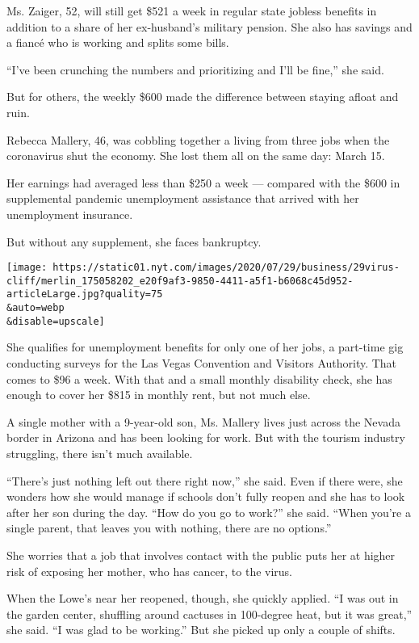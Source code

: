 Ms. Zaiger, 52, will still get \$521 a week in regular state jobless
benefits in addition to a share of her ex-husband's military pension.
She also has savings and a fiancé who is working and splits some bills.

``I've been crunching the numbers and prioritizing and I'll be fine,''
she said.

But for others, the weekly \$600 made the difference between staying
afloat and ruin.

Rebecca Mallery, 46, was cobbling together a living from three jobs when
the coronavirus shut the economy. She lost them all on the same day:
March 15.

Her earnings had averaged less than \$250 a week --- compared with the
\$600 in supplemental pandemic unemployment assistance that arrived with
her unemployment insurance.

But without any supplement, she faces bankruptcy.

\texttt{[image: https://static01.nyt.com/images/2020/07/29/business/29virus-cliff/merlin\_175058202\_e20f9af3-9850-4411-a5f1-b6068c45d952-articleLarge.jpg?quality=75\\\&auto=webp\\\&disable=upscale]}

She qualifies for unemployment benefits for only one of her jobs, a
part-time gig conducting surveys for the Las Vegas Convention and
Visitors Authority. That comes to \$96 a week. With that and a small
monthly disability check, she has enough to cover her \$815 in monthly
rent, but not much else.

A single mother with a 9-year-old son, Ms. Mallery lives just across the
Nevada border in Arizona and has been looking for work. But with the
tourism industry struggling, there isn't much available.

``There's just nothing left out there right now,'' she said. Even if
there were, she wonders how she would manage if schools don't fully
reopen and she has to look after her son during the day. ``How do you go
to work?'' she said. ``When you're a single parent, that leaves you with
nothing, there are no options.''

She worries that a job that involves contact with the public puts her at
higher risk of exposing her mother, who has cancer, to the virus.

When the Lowe's near her reopened, though, she quickly applied. ``I was
out in the garden center, shuffling around cactuses in 100-degree heat,
but it was great,'' she said. ``I was glad to be working.'' But she
picked up only a couple of shifts.

